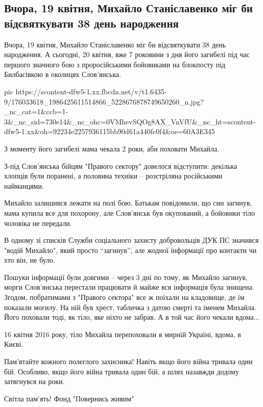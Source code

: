  
 
 
 
 

\subsection{Вчора, 19 квітня, Михайло Станіславенко міг би відсвяткувати 38 день народження}

Вчора, 19 квітня, Михайло Станіславенко міг би відсвяткувати 38 день
народження. А сьогодні, 20 квітня, вже 7 роковини з дня його загибелі під час
першого значного бою з проросійськими бойовиками на блокпосту під Билбасівкою в
околицях Слов'янська.

\ifcmt
  pic https://scontent-dfw5-1.xx.fbcdn.net/v/t1.6435-9/176033618_1986425611514866_5228676878749650260_n.jpg?_nc_cat=1&ccb=1-3&_nc_sid=730e14&_nc_ohc=0VMhevSQOg8AX_VnVfU&_nc_ht=scontent-dfw5-1.xx&oh=92234e2257936115bb90d61a440fc0f4&oe=60A3E345
\fi

З моменту його загибелі мама чекала 2 роки, аби поховати Михайла.

З-під Слов'янська бійцям "Правого сектору" довелося відступити: декілька
хлопців були поранені, а половина техніки – розстріляна російськими найманцями.

Михайло залишився лежати на полі бою. Батькам повідомили, що син загинув, мама
купила все для похорону, але Слов'янськ був окупований, а бойовики тіло
чоловіка не передали.

В одному зі списків Служби соціального захисту добровольців ДУК ПС значився
"водій Михайло", який просто “загинув”, але жодної інформації про контакти чи
хто він, не було.

Пошуки інформації були довгими – через 3 дні по тому, як Михайло загинув, морги
Слов'янська перестали працювати й майже вся інформація була знищена. Згодом,
побратимами з "Правого сектора" все ж поїхали на кладовище, де їм показали
могилу. На ній був хрест, табличка з датою смерті та іменем Михайла. Його
поховали тоді, як тіло, яке ніхто не забрав. А в той час його чекали вдома...

16 квітня 2016 року, тіло Михайла перепоховали в мирній Україні, вдома, в Києві.

Пам'ятайте кожного полеглого захисника! Навіть якщо його війна тривала один
бій. Особливо, якщо його війна тривала один бій, а шлях назавжди додому
затягнувся на роки.

Світла пам'ять!  Фонд "Повернись живим"
